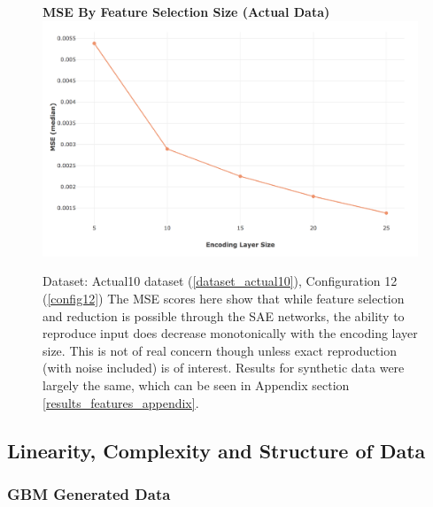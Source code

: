 \documentclass[a4paper,11pt,oneside]{article}
\theoremstyle{plain}
\theoremstyle{definition}
\begin{document}
	
		\begin{figure}[H]
		\centering 
		\textbf{MSE By Feature Selection Size (Actual Data)}
		\includegraphics[scale=0.4]{images/results/feature_selection/actual_sae_mse.png}
		\caption[MSE By Feature Selection Size (Actual Data)]{Dataset: Actual10 dataset (\ref{dataset_actual10}), Configuration 12 (\ref{config12})
			\newline The MSE scores here show that while feature selection and reduction is possible through the SAE networks, the ability to reproduce input does decrease monotonically with the encoding layer size. This is not of real concern though unless exact reproduction (with noise included) is of interest. Results for synthetic data were largely the same, which can be seen in Appendix section \ref{results_features_appendix}.}
		\label{figure-actual_sae_mse}
	\end{figure}
	
	
	
	

	
	
	
	
	
	
	
	
	
	
	
	
	
	
	
	
	
	
	
	\newpage
	\subsection{Linearity, Complexity and Structure of Data}\label{results_linearity}
	
	\subsubsection{GBM Generated Data}\label{results_gbm_data}
	
\end{document}
